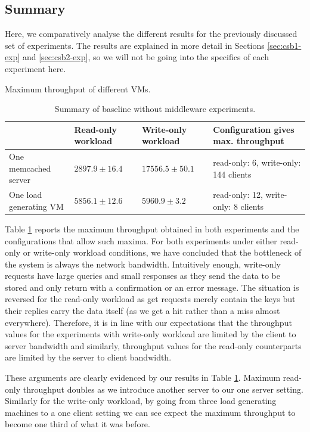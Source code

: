 \documentclass[11pt,a4paper]{article}
\begin{document}
\subsection{Summary} \label{sec:csb-summary}
Here, we comparatively analyse the different results for the previously discussed set of experiments. The results are explained in more detail in Sections \ref{sec:csb1-exp} and \ref{sec:csb2-exp}, so we will not be going into the specifics of each experiment here.
\begin{table}[h]
\small
\centering
{Maximum throughput of different VMs.}
\begin{tabular}{|l|p{2.1cm}|p{2.2cm}|p{6cm}|}
\hline 	                      & Read-only workload & Write-only workload & Configuration gives max. throughput \\ 
\hline One memcached server & $2897.9 \pm 16.4$ & $17556.5 \pm 50.1$ & read-only: 6, write-only: 144 clients \\ 
\hline One load generating VM & $5856.1 \pm 12.6$ & $5960.9 \pm 3.2$   & read-only: 12, write-only: 8 clients \\ 
\hline 
\end{tabular}
\caption{Summary of baseline without middleware experiments.} \label{tab:csb-summary}
\end{table}
\par Table \ref{tab:csb-summary} reports the maximum throughput obtained in both experiments and the configurations that allow such maxima. For both experiments under either read-only or write-only workload conditions, we have concluded that the bottleneck of the system is always the network bandwidth. Intuitively enough, write-only requests have large queries and small responses as they send the data to be stored and only return with a confirmation or an error message. The situation is reversed for the read-only workload as get requests merely contain the keys but their replies carry the data itself (as we get a hit rather than a miss almost everywhere). Therefore, it is in line with our expectations that the throughput values for the experiments with write-only workload are limited by the client to server bandwidth and similarly, throughput values for the read-only counterparts are limited by the server to client bandwidth.
\par These arguments are clearly evidenced by our results in Table \ref{tab:csb-summary}. Maximum read-only throughput doubles as we introduce another server to our one server setting. Similarly for the write-only workload, by going from three load generating machines to a one client setting we can see expect the maximum throughput to become one third of what it was before.
\end{document}
